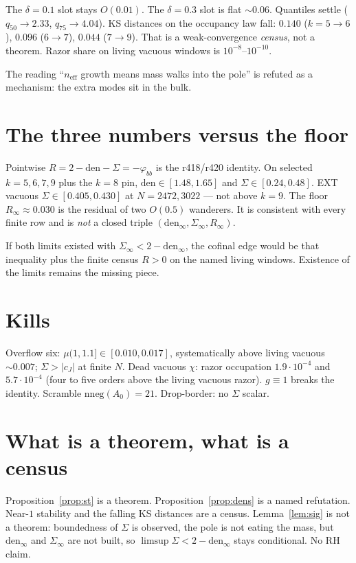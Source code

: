 \documentclass[11pt]{article}
\theoremstyle{remark}
\newcommand{\phibb}{\varphi_{bb}}
\begin{document}
The $\delta=0.1$ slot stays $O(0.01)$.
The $\delta=0.3$ slot is flat $\sim 0.06$.
Quantiles settle ($q_{50}\to 2.33$, $q_{75}\to 4.04$).
KS distances on the occupancy law fall:
$0.140$ ($k=5\to 6$), $0.096$ ($6\to 7$),
$0.044$ ($7\to 9$).
That is a weak-convergence \emph{census}, not a
theorem.
Razor share on living vacuous windows is
$10^{-8}$--$10^{-10}$.

The reading ``$n_{\mathrm{eff}}$ growth means mass
walks into the pole'' is refuted as a mechanism:
the extra modes sit in the bulk.

\section{The three numbers versus the floor}\label{sec:bal}

Pointwise $R=2-\mathrm{den}-\Sigma=-\phibb$ is the
r418/r420 identity.
On selected $k=5,6,7,9$ plus the $k=8$ pin,
$\mathrm{den}\in[1.48,1.65]$ and
$\Sigma\in[0.24,0.48]$.
EXT vacuous $\Sigma\in[0.405,0.430]$ at
$N=2472,3022$ --- not above $k=9$.
The floor $R_\infty\approx 0.030$ is the residual
of two $O(0.5)$ wanderers.
It is consistent with every finite row and is
\emph{not} a closed triple
$(\mathrm{den}_\infty,\Sigma_\infty,R_\infty)$.

If both limits existed with
$\Sigma_\infty<2-\mathrm{den}_\infty$, the cofinal
edge would be that inequality plus the finite
census $R>0$ on the named living windows.
Existence of the limits remains the missing
piece.

\section{Kills}\label{sec:kills}

Overflow six: $\mu(1,1.1]\in[0.010,0.017]$,
systematically above living vacuous $\sim 0.007$;
$\Sigma>|c_J|$ at finite $N$.
Dead vacuous $\chi$: razor occupation
$1.9\cdot 10^{-4}$ and $5.7\cdot 10^{-4}$
(four to five orders above the living vacuous
razor).
$g\equiv 1$ breaks the identity.
Scramble $\mathrm{nneg}(A_{0})=21$.
Drop-border: no $\Sigma$ scalar.

\section{What is a theorem, what is a census}\label{sec:honest}

Proposition~\ref{prop:st} is a theorem.
Proposition~\ref{prop:dens} is a named refutation.
Near-$1$ stability and the falling KS distances
are a census.
Lemma~\ref{lem:sig} is not a theorem:
boundedness of $\Sigma$ is observed, the pole is
not eating the mass, but
$\mathrm{den}_\infty$ and $\Sigma_\infty$ are not
built, so $\limsup\Sigma<2-\mathrm{den}_\infty$
stays conditional.
No RH claim.
\end{document}
